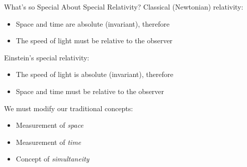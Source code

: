 \documentclass[12pt,compress,aspectratio=169]{beamer}
\begin{document}
\begin{frame}{What's so Special About Special Relativity?}
  Classical (Newtonian) relativity:
  \begin{itemize}
  \item Space and time are absolute (invariant), therefore
  \item The speed of light must be relative to the observer
  \end{itemize}

  \vspace{.1in}Einstein's special relativity:
  \begin{itemize}
  \item The speed of light is absolute (invariant), therefore
  \item Space and time must be relative to the observer
  \end{itemize}

  \vspace{.1in}We must modify our traditional concepts:
  \begin{itemize}
  \item Measurement of \emph{space}
  \item Measurement of \emph{time}
  \item Concept of \emph{simultaneity}
  \end{itemize}
\end{frame}
\end{document}
